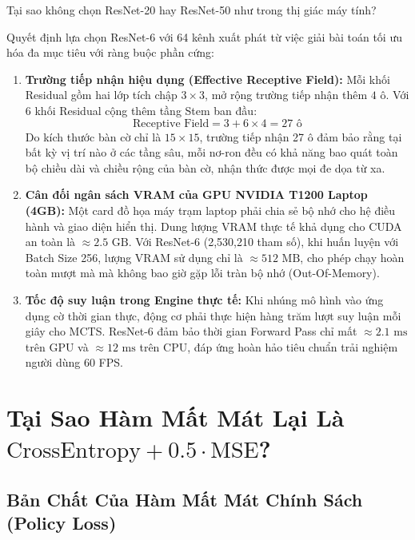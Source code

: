 \documentclass[11pt,a4paper]{report}
\begin{document}
Tại sao không chọn ResNet-20 hay ResNet-50 như trong thị giác máy tính?

Quyết định lựa chọn ResNet-6 với 64 kênh xuất phát từ việc giải bài toán tối ưu hóa đa mục tiêu với ràng buộc phần cứng:
\begin{enumerate}
    \item \textbf{Trường tiếp nhận hiệu dụng (Effective Receptive Field):} Mỗi khối Residual gồm hai lớp tích chập $3 \times 3$, mở rộng trường tiếp nhận thêm $4$ ô. Với 6 khối Residual cộng thêm tầng Stem ban đầu:
    \begin{equation}
        \text{Receptive Field} = 3 + 6 \times 4 = 27\text{ ô}
    \end{equation}
    Do kích thước bàn cờ chỉ là $15 \times 15$, trường tiếp nhận 27 ô đảm bảo rằng tại bất kỳ vị trí nào ở các tầng sâu, mỗi nơ-ron đều có khả năng bao quát toàn bộ chiều dài và chiều rộng của bàn cờ, nhận thức được mọi đe dọa từ xa.
    \item \textbf{Cân đối ngân sách VRAM của GPU NVIDIA T1200 Laptop (4GB):} Một card đồ họa máy trạm laptop phải chia sẻ bộ nhớ cho hệ điều hành và giao diện hiển thị. Dung lượng VRAM thực tế khả dụng cho CUDA an toàn là $\approx 2.5\text{ GB}$. Với ResNet-6 (2,530,210 tham số), khi huấn luyện với Batch Size 256, lượng VRAM sử dụng chỉ là $\approx 512\text{ MB}$, cho phép chạy hoàn toàn mượt mà mà không bao giờ gặp lỗi tràn bộ nhớ (Out-Of-Memory).
    \item \textbf{Tốc độ suy luận trong Engine thực tế:} Khi nhúng mô hình vào ứng dụng cờ thời gian thực, động cơ phải thực hiện hàng trăm lượt suy luận mỗi giây cho MCTS. ResNet-6 đảm bảo thời gian Forward Pass chỉ mất $\approx 2.1\text{ ms}$ trên GPU và $\approx 12\text{ ms}$ trên CPU, đáp ứng hoàn hảo tiêu chuẩn trải nghiệm người dùng 60 FPS.
\end{enumerate}

\chapter{Tại Sao Hàm Mất Mát Lại Là $\text{CrossEntropy} + 0.5 \cdot \text{MSE}$?}

\section{Bản Chất Của Hàm Mất Mát Chính Sách (Policy Loss)}
\end{document}
